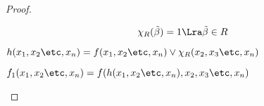 \documentclass[unicode, 10pt, a4paper, oneside, fleqn]{article}
\begin{document}
\begin{proof}
\begin{itemize}
\begin{itemize}
\begin{itemize}
\begin{denote}
                \begin{displaymath}
                  \chi_R(\tilde\beta)=1 \Lra \tilde\beta\in R
                \end{displaymath}
              \end{denote}
              \begin{denote}
                \begin{math}
                  h(\set[x]{n})=f(\set[x]{n})\vee\chi_R(\setf[x]{n})
                \end{math}
              \end{denote}
              \begin{denote}
                \begin{math}
                  f_1(\set[x]{n})=f(h(\set[x]{n}),\setf[x]{n})
                \end{math}
              \end{denote}

\end{itemize}
\end{itemize}
\end{itemize}
\end{proof}
\end{document}
